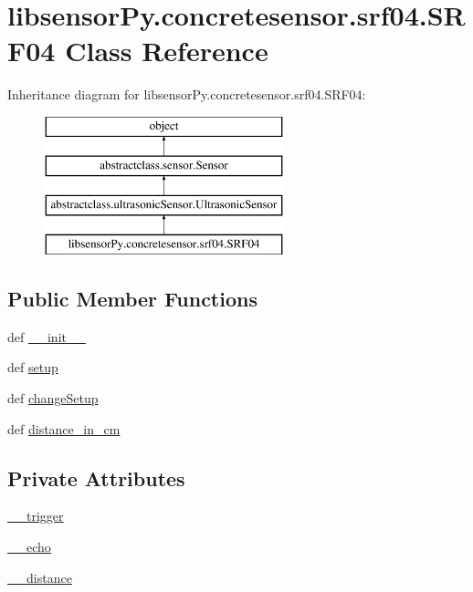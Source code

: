 \hypertarget{classlibsensorPy_1_1concretesensor_1_1srf04_1_1SRF04}{}\section{libsensor\+Py.\+concretesensor.\+srf04.\+S\+R\+F04 Class Reference}
\label{classlibsensorPy_1_1concretesensor_1_1srf04_1_1SRF04}
Inheritance diagram for libsensor\+Py.\+concretesensor.\+srf04.\+S\+R\+F04\+:\begin{figure}[H]
\begin{center}
\leavevmode
\includegraphics[height=4.000000cm]{classlibsensorPy_1_1concretesensor_1_1srf04_1_1SRF04}
\end{center}
\end{figure}
\subsection*{Public Member Functions}
\begin{DoxyCompactItemize}
\item 
def \hyperlink{classlibsensorPy_1_1concretesensor_1_1srf04_1_1SRF04_a3647574b4dc27bdd0f7b5c86dd59d0ff}{\+\_\+\+\_\+init\+\_\+\+\_\+}
\item 
def \hyperlink{classlibsensorPy_1_1concretesensor_1_1srf04_1_1SRF04_a4ada9c810ea317d0a2e52a7dde45de90}{setup}
\item 
def \hyperlink{classlibsensorPy_1_1concretesensor_1_1srf04_1_1SRF04_a2f507b94c680df89008dbe57476ce893}{change\+Setup}
\item 
def \hyperlink{classlibsensorPy_1_1concretesensor_1_1srf04_1_1SRF04_a22469d2151f698aa9ec13871136f5fe9}{distance\+\_\+in\+\_\+cm}
\end{DoxyCompactItemize}
\subsection*{Private Attributes}
\begin{DoxyCompactItemize}
\item 
\hyperlink{classlibsensorPy_1_1concretesensor_1_1srf04_1_1SRF04_af28a8e4ad1c37b75e6c45f97ca898336}{\+\_\+\+\_\+trigger}
\item 
\hyperlink{classlibsensorPy_1_1concretesensor_1_1srf04_1_1SRF04_a51d6299de48d9dc18dd1940ef5bb4a36}{\+\_\+\+\_\+echo}
\item 
\hyperlink{classlibsensorPy_1_1concretesensor_1_1srf04_1_1SRF04_a074d446e5ceebedba098ba30442e5bee}{\+\_\+\+\_\+distance}
\end{DoxyCompactItemize}


